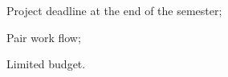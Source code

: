 \begin{item-c}
\item Project deadline at the end of the semester;
\item Pair work flow;
\item Limited budget.
\end{item-c}

%
%  

